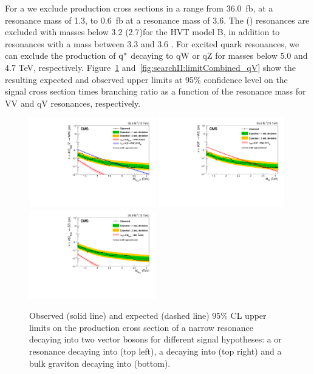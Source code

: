 \noindent For a \BulkG we exclude production cross sections in a range from 36.0~fb, at a resonance mass of 1.3\TeV, to 0.6~fb at a resonance mass of 3.6\TeV. The \PWpr (\PZpr) resonances are excluded with masses below 3.2 (2.7)\TeV for the HVT model B, in addition to \PWpr resonances with a mass between 3.3 and 3.6 \TeV. For excited quark resonances, we can exclude the production of $\rm{q}^*$ decaying to qW or qZ for masses below 5.0 and 4.7 TeV, respectively. Figure~\ref{fig:searchII:limitCombined_VV} and~\ref{fig:searchII:limitCombined_qV} show the resulting expected and observed upper limits at 95\% confidence level on the signal cross section times branching ratio as a function of the resonance mass for VV and qV resonances, respectively.
\begin{figure}[h!]
\centering
    \includegraphics[width=0.49\textwidth]{figures/analysis/search2/B2G-17-001/figures/brazilianFlag_BulkWW_VVnew_new_combined_13TeV.pdf}
    \includegraphics[width=0.49\textwidth]{figures/analysis/search2/B2G-17-001/figures/brazilianFlag_WZ_VVnew_new_combined_13TeV.pdf}\\
    \includegraphics[width=0.49\textwidth]{figures/analysis/search2/B2G-17-001/figures/brazilianFlag_BulkZZ_VVnew_new_combined_13TeV.pdf}
\caption{Observed (solid line) and expected (dashed line) 95\% CL upper limits on the production cross section of a narrow resonance decaying into two vector bosons for different signal hypotheses: a \PZpr or \BulkG resonance decaying into \WW (top left), a \PZpr decaying into \PW\PZ (top right) and a bulk graviton decaying into \ZZ (bottom).}
\label{fig:searchII:limitCombined_VV}
\end{figure}
